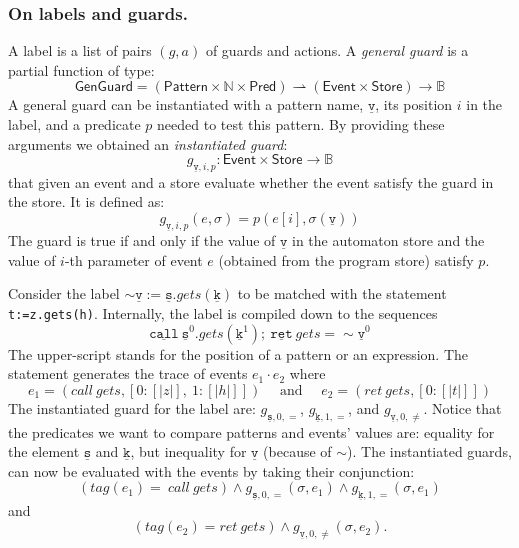\documentclass{llncs} %
\newcommand{\B}{\ensuremath{\mathbb{B}}}
\newcommand{\N}{\ensuremath{\mathbb{N}}}
\newcommand{\pattern}[1]{\ensuremath{\mathtt{\underline{#1}}}}
\newcommand{\pmap}{\rightharpoonup}
\newcommand{\set}[1]{\ensuremath{\mathsf{#1}}}
\begin{document}
\subsubsection{On labels and guards.}
 A label is a list of pairs $(g,a)$ of guards and actions. A  {\em general guard} is a partial function of type:
\[
\set{GenGuard} = (\set{Pattern} \times \N \times \set{Pred}) \pmap (\set{Event}\times\set{Store}) \to \B
\]
A general guard can be instantiated with a pattern  name, $\pattern v$,  its position $i$ in the label, and a predicate $p$ needed to test this pattern. By providing these arguments we obtained an {\em instantiated guard}:
\[
g_{\pattern{v},i,p} : \set{Event}\times\set{Store} \to \B
\]
that given an event and a store evaluate whether the event satisfy the guard in the store. It is defined as:
\newcommand{\sem}[1]{[ \! | #1 | \! ]}
\[
g_{\pattern{v},i,p}(e, \sigma) = p(e[i],\sigma(\pattern v))
\] The guard is true if and only if the value of $\pattern{v}$ in the automaton store 
and the value of $i$-th parameter of  event $e$ (obtained from the program store) satisfy $p$.
\begin{example}
Consider the label 
 $\sim \pattern {v} := \pattern {s}.gets(\pattern {k})$ to be matched with the statement 
 {\tt t:=z.gets(h)}. Internally,  the label is compiled down to the sequences 
\[
\pattern{call} \  \pattern{s}^0 .gets(\pattern {k}^1);  \ \pattern{ret} \ gets = \sim \pattern {v}^0   
\] The upper-script stands for the position of a pattern or an expression. The statement generates the trace of events $e_1 \cdot e_2$ where 
\[ 
 e_1=(call \ gets, [0: \sem{z}, \ 1: \sem{h}])  \quad \mbox{ and }  \quad e_2= (ret \ gets, [0: \sem{t}])
\] 
The instantiated guard for the label are:
 $g_{\pattern{s},0,=}$, $g_{\pattern{k},1,=}$, and  $g_{\pattern{v},0, \neq}$.  
Notice that the predicates we want to compare patterns and events' values are: equality for the element $\pattern{s}$ and $\pattern{k}$, 
but inequality for \pattern{v} (because of $\sim$).
The instantiated guards, can now be evaluated with the events by taking their conjunction:
\[ 
 (tag(e_1)= \ call \ gets) \wedge g_{\pattern{s},0,=}(\sigma,e_1) \wedge g_{\pattern{k},1,=}(\sigma, e_1) 
\] and 
\[ 
 (tag(e_2)= ret \ gets) \wedge g_{\pattern{v},0,\neq}(\sigma,e_2).
\]
\end{example}
\end{document}
